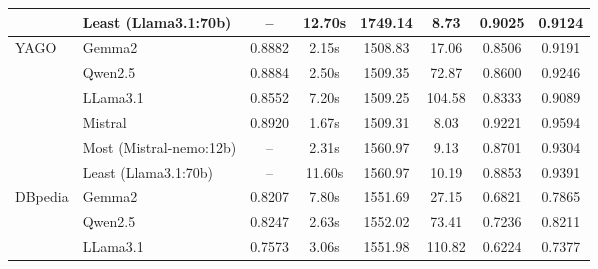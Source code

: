 \begin{table}[ht!]
{\begin{threeparttable}
\begin{tabular}{llcccc||cc}
                                            & Least (Llama3.1:70b)               & --                             & 12.70s                           & 1749.14                                       & 8.73             & 0.9025    & 0.9124   \\ \hline \hline
                \multirow{6}{*}{YAGO}       & Gemma2                             & 0.8882                         & 2.15s                            & 1508.83                                       & 17.06            & 0.8506    & 0.9191   \\
                                            & Qwen2.5                            & 0.8884                         & 2.50s                            & 1509.35                                       & 72.87            & 0.8600    & 0.9246   \\
                                            & LLama3.1                           & 0.8552                         & 7.20s                            & 1509.25                                       & 104.58           & 0.8333    & 0.9089   \\
                                            & Mistral                            & 0.8920                         & 1.67s                            & 1509.31                                       & 8.03             & 0.9221    & 0.9594   \\ \cline{2-8}
                                            & Most (Mistral-nemo:12b)            & --                             & 2.31s                            & 1560.97                                       & 9.13             & 0.8701    & 0.9304   \\
                                            & Least (Llama3.1:70b)               & --                             & 11.60s                           & 1560.97                                       & 10.19            & 0.8853    & 0.9391   \\ \hline \hline
                \multirow{6}{*}{DBpedia}    & Gemma2                             & 0.8207                         & 7.80s                            & 1551.69                                       & 27.15            & 0.6821    & 0.7865   \\
                                            & Qwen2.5                            & 0.8247                         & 2.63s                            & 1552.02                                       & 73.41            & 0.7236    & 0.8211   \\
                                            & LLama3.1                           & 0.7573                         & 3.06s                            & 1551.98                                       & 110.82           & 0.6224    & 0.7377   \\

\end{tabular}
\end{threeparttable}}
\end{table}

